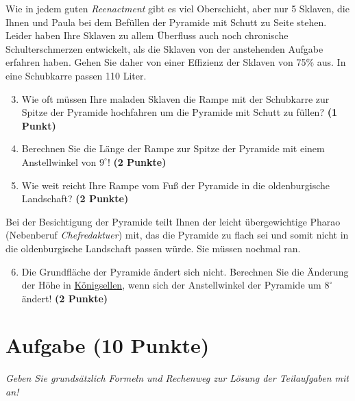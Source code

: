 \documentclass[a4paper, 9pt]{scrartcl}\usepackage[]{graphicx}\usepackage[]{xcolor}
\begin{document}
Wie in jedem guten \textit{Reenactment} gibt es viel Oberschicht, aber nur 5 Sklaven, die Ihnen und Paula bei dem Befüllen der Pyramide mit Schutt zu Seite stehen. Leider haben Ihre Sklaven zu allem Überfluss auch noch chronische Schulterschmerzen entwickelt, als die Sklaven von der anstehenden Aufgabe erfahren haben. Gehen Sie daher von einer Effizienz der Sklaven von 75\% aus. In eine Schubkarre passen 110 Liter.

\begin{enumerate}
  \setcounter{enumi}{2}
\item Wie oft müssen Ihre maladen Sklaven die Rampe mit der Schubkarre zur Spitze der Pyramide hochfahren um die Pyramide mit Schutt zu füllen? \textbf{(1 Punkt)}
\item Berechnen Sie die Länge der Rampe zur Spitze der Pyramide mit einem Anstellwinkel von $9^\circ$! \textbf{(2 Punkte)}
\item Wie weit reicht Ihre Rampe vom Fuß der Pyramide in die oldenburgische Landschaft?  \textbf{(2 Punkte)}
\end{enumerate}

Bei der Besichtigung der Pyramide teilt Ihnen der leicht übergewichtige Pharao (Nebenberuf \textit{Chefredaktuer}) mit, das die Pyramide zu flach sei und somit nicht in die oldenburgische Landschaft passen würde. Sie müssen nochmal ran.

\begin{enumerate}
  \setcounter{enumi}{5}
\item Die Grundfläche der Pyramide ändert sich nicht. Berechnen Sie die Änderung der Höhe in \underline{Königsellen}, wenn sich der Anstellwinkel der Pyramide um $8^\circ$ ändert!  \textbf{(2 Punkte)}
\end{enumerate}



\clearpage

\section{Aufgabe \hfill (10 Punkte)}

\textit{Geben Sie grundsätzlich Formeln und Rechenweg zur Lösung der Teilaufgaben mit an!} \\[1Ex]
 
\end{document}
